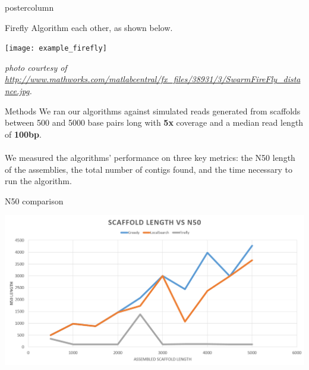 \documentclass[final,hyperref={pdfpagelabels=false}]{beamer}
\begin{document}
\begin{frame}
\begin{columns}
\begin{column}{.32\textwidth}
\begin{beamercolorbox}[center,wd=\textwidth]{postercolumn}
\begin{minipage}[T]{.95\textwidth}
{\begin{block}{Firefly Algorithm}
                            each other, as shown below.
                            \begin{center}
                                \texttt{[image: example\_firefly]}
                            \end{center}
                            {\em {\small photo courtesy of \url{http://www.mathworks.com/matlabcentral/fx_files/38931/3/SwarmFireFly_distance.jpg}. } }
                        \end{block}
                        \begin{block}{Methods}
                            We ran our algorithms against simulated reads
                            generated from scaffolds between 500 and 5000 base
                            pairs long with {\bf 5x} coverage and a median read
                            length of {\bf 100bp}. \\ \\
                            We measured the algorithms' performance on three
                            key metrics: the N50 length of the assemblies, the
                            total number of contigs found, and the time
                            necessary to run the algorithm.
                        \end{block}
                        \begin{block}{N50 comparison}
                            \begin{center}
                                \includegraphics[scale=0.66]{n50_poster}
                            \end{center}
                        \end{block}
                    }
        \end{minipage}
    \end{beamercolorbox}
        \end{column}

\end{columns}
\end{frame}
\end{document}
